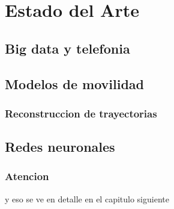 \chapter{Estado del Arte}\label{chapter:state-of-the-art}

\section{Big data y telefonia} 

\section{Modelos de movilidad}

\subsection{Reconstruccion de trayectorias}

\section{Redes neuronales}

\subsection{Atencion}

y eso se ve en detalle en el capitulo siguiente